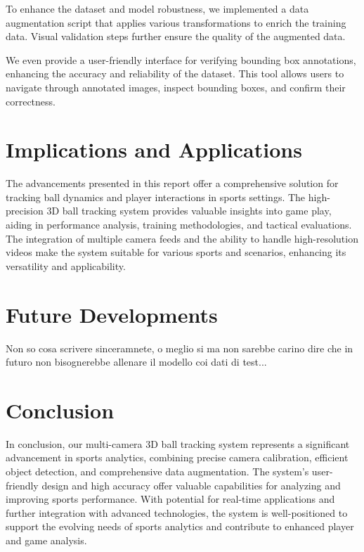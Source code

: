 \documentclass{template}
\begin{document}
To enhance the dataset and model robustness, we implemented a data augmentation script that applies various transformations to enrich the training data. Visual validation steps further ensure the quality of the augmented data.

We even provide a user-friendly interface for verifying bounding box annotations, enhancing the accuracy and reliability of the dataset. This tool allows users to navigate through annotated images, inspect bounding boxes, and confirm their correctness.

\section{Implications and Applications}
The advancements presented in this report offer a comprehensive solution for tracking ball dynamics and player interactions in sports settings. The high-precision 3D ball tracking system provides valuable insights into game play, aiding in performance analysis, training methodologies, and tactical evaluations. The integration of multiple camera feeds and the ability to handle high-resolution videos make the system suitable for various sports and scenarios, enhancing its versatility and applicability.

\section{Future Developments}
Non so cosa scrivere sinceramnete, o meglio si ma non sarebbe carino dire che in futuro non bisognerebbe allenare il modello coi dati di test...

\section{Conclusion}
In conclusion, our multi-camera 3D ball tracking system represents a significant advancement in sports analytics, combining precise camera calibration, efficient object detection, and comprehensive data augmentation. The system's user-friendly design and high accuracy offer valuable capabilities for analyzing and improving sports performance. With potential for real-time applications and further integration with advanced technologies, the system is well-positioned to support the evolving needs of sports analytics and contribute to enhanced player and game analysis.
\end{document}
